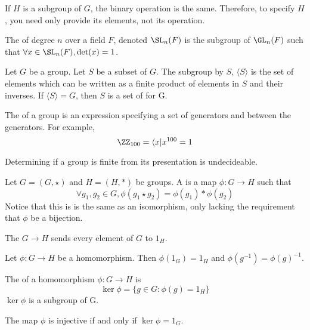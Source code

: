 \documentclass{article}
\begin{document}
\begin{remark}
  If $H$ is a subgroup of $G$, the binary operation is the same. Therefore,
  to specify $H$, you need only provide its elements, not its operation. 
\end{remark}

\begin{defn}
  The  of degree $n$ over a field $F$, denoted $\SL_n(F)$
  is the subgroup of $\GL_n(F)$ such that $\forall x \in \SL_n(F), \det(x) = 1$.
\end{defn}

\begin{defn}
  Let $G$ be a group. Let $S$ be a subset of $G$. The subgroup  by
  $S$, $\langle S \rangle$ is the set of elements which can be written as a finite
  product of elements in $S$ and their inverses. If $\langle S \rangle = G$,
  then $S$ is a set of  for G. 
\end{defn}

\begin{defn}
  The  of a group is an expression specifying a
  set of generators and  between the generators. For example,
  $$\ZZ_{100} = \langle x | x^{100} = 1$$
\end{defn}

\begin{remark}
  Determining if a group is finite from its presentation is undecideable.
\end{remark}

\begin{defn}
  Let $G = (G, \star)$ and $H = (H, *)$ be groups. A 
  is a map $\phi : G \rightarrow H$ such that
  $$\forall g_1, g_2 \in G, \phi(g_1 \star g_2) = \phi(g_1) * \phi(g_2)$$
  Notice that this is is the same as an isomorphism, only lacking the requirement that
  $\phi$ be a bijection. 
\end{defn}

\begin{defn}
  The  $G \rightarrow H$ sends every element of $G$ to $1_H$.
\end{defn}

\begin{fact}
  Let $\phi : G \rightarrow H$ be a homomorphism. Then $\phi(1_G) = 1_H$ and
  $\phi(g^{-1}) = \phi(g)^{-1}$.
\end{fact}

\begin{defn}
  The  of a homomorphism $\phi : G \rightarrow H$ is
  $$\ker \phi = \{g \in G : \phi(g) = 1_H\}$$
  $\ker \phi$ is a subgroup of G. 
\end{defn}

\begin{prop}
  The map $\phi$ is injective if and only if $\ker \phi = {1_G}$. 
\end{prop}
    
\end{document}
